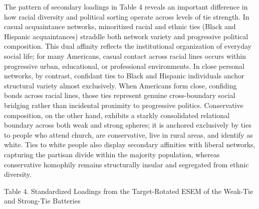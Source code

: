 \documentclass[
  12pt
]{article}
\begin{document}
The pattern of secondary loadings in Table 4 reveals an important difference in how racial diversity and political sorting operate across levels of tie strength. In casual acquaintance networks, minoritized racial and ethnic ties (Black and Hispanic acquaintances) straddle both network variety and progressive political composition. This dual affinity reflects the institutional organization of everyday social life; for many Americans, casual contact across racial lines occurs within progressive urban, educational, or professional environments. In close personal networks, by contrast, confidant ties to Black and Hispanic individuals anchor structural variety almost exclusively. When Americans form close, confiding bonds across racial lines, those ties represent genuine cross-boundary social bridging rather than incidental proximity to progressive politics. Conservative composition, on the other hand, exhibits a starkly consolidated relational boundary across both weak and strong spheres; it is anchored exclusively by ties to people who attend church, are conservative, live in rural areas, and identify as white. Ties to white people also display secondary affinities with liberal networks, capturing the partisan divide within the majority population, whereas conservative homophily remains structurally insular and segregated from ethnic diversity.


Table 4. Standardized Loadings from the Target-Rotated ESEM of the Weak-Tie and Strong-Tie Batteries
\end{document}
